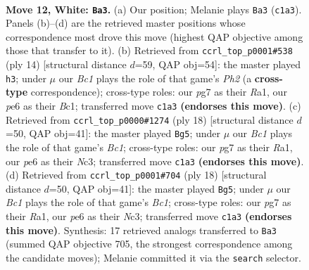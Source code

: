 \documentclass[11pt]{article}
\begin{document}
\clearpage

\begin{figure}[p]\centering
\begin{subfigure}{0.46\textwidth}\centering
\resizebox{\linewidth}{!}{%
\newchessgame
\chessboard[
  setfen={rnbq1rk1/1p3pp1/4pn2/p6p/2BP4/2P2N2/P2Q1PPP/R1B2RK1 w - - 0 12},
  showmover=false,
  pgfstyle=straightmove, color=movearrow, markmove={c1-a3}
]}
\caption{}
\end{subfigure}\hfill
\begin{subfigure}{0.46\textwidth}\centering
\resizebox{\linewidth}{!}{%
\newchessgame
\chessboard[
  setfen={rnbq1rk1/ppp1ppbp/5np1/8/2BP4/2N2N2/PPP2PPP/R1BQ1RK1 w - - 4 8},
  showmover=false,
  pgfstyle=straightmove, color=movearrow, markmove={h2-h3}
]}
\caption{}
\end{subfigure}
\\[4pt]
\begin{subfigure}{0.46\textwidth}\centering
\resizebox{\linewidth}{!}{%
\newchessgame
\chessboard[
  setfen={rnbq1rk1/p4ppp/1p2pn2/8/1bBP4/2N2N2/PP3PPP/R1BQ1RK1 w - - 0 10},
  showmover=false,
  pgfstyle=straightmove, color=movearrow, markmove={c1-g5}
]}
\caption{}
\end{subfigure}\hfill
\begin{subfigure}{0.46\textwidth}\centering
\resizebox{\linewidth}{!}{%
\newchessgame
\chessboard[
  setfen={rnbq1rk1/p4ppp/1p2pn2/8/1bBP4/2N2N2/PP3PPP/R1BQ1RK1 w - - 0 10},
  showmover=false,
  pgfstyle=straightmove, color=movearrow, markmove={c1-g5}
]}
\caption{}
\end{subfigure}
\caption{\textbf{Move 12, White: \texttt{Ba3}.} (a) Our position; Melanie plays \texttt{Ba3} (\texttt{c1a3}). Panels (b)--(d) are the retrieved master positions whose correspondence most drove this move (highest QAP objective among those that transfer to it). (b) Retrieved from \texttt{ccrl\_top\_p0001\#538} (ply 14) [structural distance $d$=59, QAP obj=54]: the master played \texttt{h3}; under $\mu$ our \emph{Bc1} plays the role of that game's \emph{Ph2} (a \textbf{cross-type} correspondence); cross-type roles: our \emph{p}g7 as their \emph{R}a1, our \emph{p}e6 as their \emph{B}c1; transferred move \texttt{c1a3} \textbf{(endorses this move)}. (c) Retrieved from \texttt{ccrl\_top\_p0000\#1274} (ply 18) [structural distance $d$=50, QAP obj=41]: the master played \texttt{Bg5}; under $\mu$ our \emph{Bc1} plays the role of that game's \emph{Bc1}; cross-type roles: our \emph{p}g7 as their \emph{R}a1, our \emph{p}e6 as their \emph{N}c3; transferred move \texttt{c1a3} \textbf{(endorses this move)}. (d) Retrieved from \texttt{ccrl\_top\_p0001\#704} (ply 18) [structural distance $d$=50, QAP obj=41]: the master played \texttt{Bg5}; under $\mu$ our \emph{Bc1} plays the role of that game's \emph{Bc1}; cross-type roles: our \emph{p}g7 as their \emph{R}a1, our \emph{p}e6 as their \emph{N}c3; transferred move \texttt{c1a3} \textbf{(endorses this move)}. Synthesis: 17 retrieved analogs transferred to \texttt{Ba3} (summed QAP objective 705, the strongest correspondence among the candidate moves); Melanie committed it via the \texttt{search} selector.}
\label{fig:thought-m22}
\end{figure}
\end{document}
